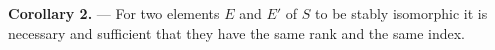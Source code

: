 \textbf{Corollary 2.} — For two elements $E$ and $E'$ of $S$ to be stably isomorphic it is necessary and sufficient that they have the same rank and the same index.
